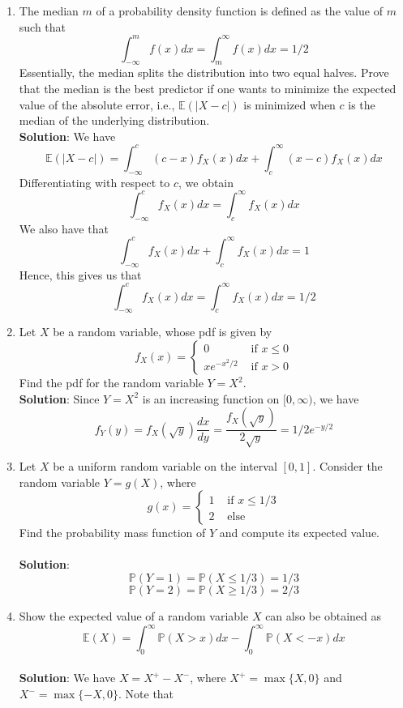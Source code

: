 \documentclass{article}
\newcommand{\dint}{\displaystyle\int}
\newcommand{\abs}[1]{\displaystyle\left\lvert#1\right\rvert}
\newcommand{\Pb}{\mathbb{P}}
\newcommand{\Eb}{\mathbb{E}}
\newcommand{\soln}[1]{\\ \textbf{Solution}: #1}
\newcommand{\bkt}[1]{\left(#1\right)}
\begin{document}
\begin{enumerate}
\begin{enumerate}
			\item
			Determine the probability that $X \in \bkt{1,2}$.\\
			\soln{
			$$\Pb\bkt{X \in (1,2)} = \dint_1^2 f_X(x)dx = \dint_1^2 x/2 dx = 3/4$$
			}
		\end{enumerate}
		\item
		The median $m$ of a probability density function is defined as the value of $m$ such that
		$$\dint_{-\infty}^m f(x) dx = \dint_m^{\infty} f(x) dx =1/2$$
		Essentially, the median splits the distribution into two equal halves. Prove that the median is the best predictor if one wants to minimize the expected value of the absolute error, i.e., $\mathbb{E}\bkt{\abs{X-c}}$ is minimized when $c$ is the median of the underlying distribution.
		\soln{
		We have
		$$\Eb\bkt{\abs{X-c}} = \dint_{-\infty}^c \bkt{c-x}f_X(x)dx + \dint_c^{\infty} \bkt{x-c}f_X(x)dx$$
		Differentiating with respect to $c$, we obtain
		$$\int_{-\infty}^c f_X(x)dx = \dint_c^{\infty}f_X(x)dx$$
		We also have that
		$$\int_{-\infty}^c f_X(x)dx + \dint_c^{\infty}f_X(x)dx = 1$$
		Hence, this gives us that
		$$\int_{-\infty}^c f_X(x)dx = \dint_c^{\infty}f_X(x)dx = 1/2$$
		}
		\item
		Let $X$ be a random variable, whose pdf is given by
		$$f_X(x) = \begin{cases}
		0 & \text{ if }x \leq 0\\
		xe^{-x^2/2} & \text{ if }x>0
		\end{cases}$$
		Find the pdf for the random variable $Y=X^2$.
		\soln{
		Since $Y=X^2$ is an increasing function on $[0,\infty)$, we have
		$$f_Y(y) = f_X(\sqrt{y}) \dfrac{dx}{dy} = \dfrac{f_X(\sqrt{y})}{2\sqrt{y}} = 1/2e^{-y/2}$$
		}
		\item
		Let $X$ be a uniform random variable on the interval $[0,1]$. Consider the random variable $Y=g\bkt{X}$, where
		$$g(x) = \begin{cases}
		1 & \text{ if }x \leq 1/3\\
		2 & \text{ else}
		\end{cases}$$
		Find the probability mass function of $Y$ and compute its expected value.\\
		\soln{
		$$\Pb\bkt{Y=1} = \Pb\bkt{X \leq 1/3} = 1/3$$
		$$\Pb\bkt{Y=2} = \Pb\bkt{X \geq 1/3} = 2/3$$
		}
		\item
		Show the expected value of a random variable $X$ can also be obtained as
		$$\Eb\bkt{X} = \dint_0^{\infty} \Pb \bkt{X > x}dx - \dint_0^{\infty} \Pb\bkt{X < -x}dx$$
		\soln{
		We have $X = X^+ - X^-$, where $X^+ = \max\{X,0\}$ and $X^- = \max\{-X,0\}$. Note that
}
\end{enumerate}
\end{document}
